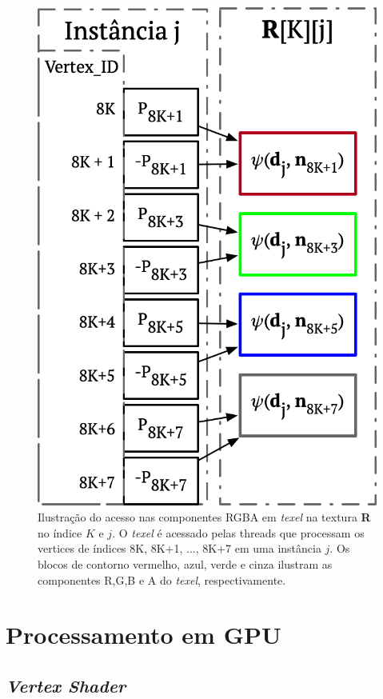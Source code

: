 \begin{figure}[ht]
    \centering
    \includegraphics[width=.45\linewidth, angle=0]{figs/Esquema_Glifo/texellookup.png}
    \caption{Ilustração do acesso nas componentes RGBA em \textit{texel} na textura \textbf{R} no índice $K$ e $j$. O \textit{texel} é acessado pelas threads que processam os vertices de índices 8K, 8K+1, ..., 8K+7 em uma instância $j$. Os blocos de contorno vermelho, azul, verde e cinza ilustram as componentes R,G,B e A do \textit{texel}, respectivamente.}
    \label{fig::texelfetch}
\end{figure}

\section{Processamento em GPU}
\label{sec::processamento_GPU}
\subsection{\textit{Vertex Shader}}

